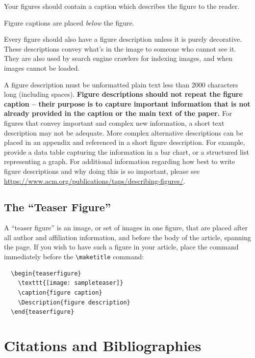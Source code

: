 Your figures should contain a caption which describes the figure to
the reader.

Figure captions are placed {\itshape below} the figure.

Every figure should also have a figure description unless it is purely
decorative. These descriptions convey what’s in the image to someone
who cannot see it. They are also used by search engine crawlers for
indexing images, and when images cannot be loaded.

A figure description must be unformatted plain text less than 2000
characters long (including spaces).  {\bfseries Figure descriptions
		should not repeat the figure caption – their purpose is to capture
		important information that is not already provided in the caption or
		the main text of the paper.} For figures that convey important and
complex new information, a short text description may not be
adequate. More complex alternative descriptions can be placed in an
appendix and referenced in a short figure description. For example,
provide a data table capturing the information in a bar chart, or a
structured list representing a graph.  For additional information
regarding how best to write figure descriptions and why doing this is
so important, please see
\url{https://www.acm.org/publications/taps/describing-figures/}.

\subsection{The ``Teaser Figure''}

A ``teaser figure'' is an image, or set of images in one figure, that
are placed after all author and affiliation information, and before
the body of the article, spanning the page. If you wish to have such a
figure in your article, place the command immediately before the
\verb|\maketitle| command:
\begin{verbatim}
  \begin{teaserfigure}
    \texttt{[image: sampleteaser]}
    \caption{figure caption}
    \Description{figure description}
  \end{teaserfigure}
\end{verbatim}

\section{Citations and Bibliographies}

